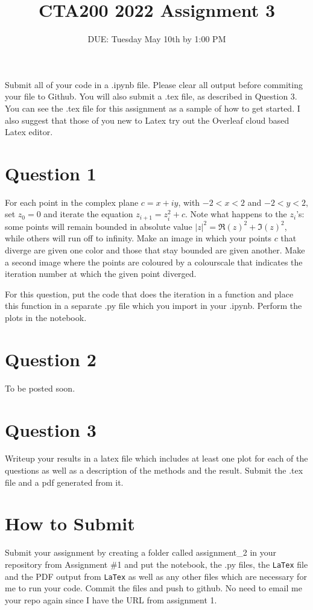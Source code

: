 \documentclass{article}
\title{CTA200 2022 Assignment 3}
\author{DUE: Tuesday May 10th by 1:00 PM}
\date{}
\begin{document}
\maketitle

Submit all of your code in a .ipynb file. Please clear all output before commiting your file to Github. You will also submit a .tex file, as described in Question 3. You can see the .tex file for this assignment as a sample of how to get started. I also suggest that those of you new to Latex try out the Overleaf cloud based Latex editor.

\section*{Question 1}

For each point in the complex plane $c = x + iy$, with $-2 < x < 2$ and $-2 < y < 2$, set $z_0 = 0$ and iterate the equation $z_{i + 1} = z_i^2 + c$. 
Note what happens to the $z_i$'s: some points will remain bounded in absolute value $|z|^2 = \Re(z)^2 + \Im(z)^2$, while others will run off to infinity. 
Make an image  in which your points $c$ that diverge are given one color and those that stay bounded are given another.
Make a second image where the points are coloured by a colourscale that indicates the iteration number at which the given point diverged.

For this question, put the code that does the iteration in a function and place this function in a separate .py file which you import in your .ipynb.
Perform the plots in the notebook.

\section*{Question 2}

To be posted soon.

\section*{Question 3}

Writeup your results in a latex file which includes at least one plot for each of the questions as well as a description of the methods and the result. Submit the .tex file and a pdf generated from it.

\section*{How to Submit}

Submit your assignment by creating a folder called assignment\_2 in your repository from Assignment \#1 and put the notebook, the .py files, the \texttt{LaTex} file and the PDF output from \texttt{LaTex} as well as any other files which are necessary for me to run your code. Commit the files and push to github. No need to email me your repo again since I have the URL from assignment 1.
\end{document}
